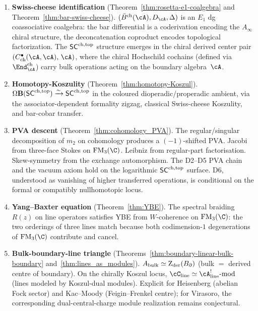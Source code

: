 \begin{enumerate}[label=\textbf{(\Alph*$'$)},leftmargin=2.5em]
\item \textbf{Swiss-cheese identification}
 (Theorem~\ref{thm:rosetta-e1-coalgebra} and
 Theorem~\ref{thm:bar-swiss-cheese}).
 $(\barBch(\cA), D_\cA, \Delta)$ is an $E_1$ dg coassociative
 coalgebra: the bar differential is a coderivation encoding
 the $A_\infty$ chiral structure, the deconcatenation coproduct
 encodes topological factorization. The $\mathsf{SC}^{\mathrm{ch,top}}$ structure
 emerges in the chiral derived center pair
 $(C^\bullet_{\mathrm{ch}}(\cA,\cA),\, \cA)$, where the
 chiral Hochschild cochains (defined via $\End^{\mathrm{ch}}_\cA$)
 carry bulk operations acting on the boundary algebra~$\cA$.

\item \textbf{Homotopy-Koszulity}
 (Theorem~\ref{thm:homotopy-Koszul}).
 $\Omega\mathbf{B}(\mathsf{SC}^{\mathrm{ch,top}}) \xrightarrow{\sim} \mathsf{SC}^{\mathrm{ch,top}}$
 in the coloured dioperadic/properadic ambient, via the
 associator-dependent formality zigzag, classical Swiss-cheese
 Koszulity, and bar-cobar transfer.

\item \textbf{PVA descent} (Theorem~\ref{thm:cohomology_PVA}).
 The regular/singular decomposition of $m_2$ on cohomology
 produces a $(-1)$-shifted PVA\@. Jacobi from three-face Stokes
 on $\FM_3(\C)$. Leibniz from regular-part factorisation.
 Skew-symmetry from the exchange automorphism. The D2--D5 PVA chain
 and the vacuum axiom hold on the logarithmic $\mathsf{SC}^{\mathrm{ch,top}}$ surface.
 D6, understood as vanishing of higher transferred operations, is
 conditional on the formal or compatibly nullhomotopic locus.

\item \textbf{Yang--Baxter equation} (Theorem~\ref{thm:YBE}).
 The spectral braiding $R(z)$ on line operators satisfies YBE
 from $W$-coherence on $\FM_3(\C)$: the two orderings of three
 lines match because both codimension-$1$ degenerations of
 $\FM_3(\C)$ contribute and cancel.

\item \textbf{Bulk-boundary-line triangle}
 (Theorems~\ref{thm:boundary-linear-bulk-boundary}
 and~\ref{thm:lines_as_modules}).
 $A_{\mathrm{bulk}} \simeq \operatorname{Z}_{\mathrm{der}}(B_{\partial})$ (bulk $=$ derived centre of
 boundary). On the chirally Koszul locus,
 $\cC_{\mathrm{line}} \simeq
 \cA^!_{\mathrm{line}}\text{-mod}$
 (lines modeled by Koszul-dual modules). Explicit for Heisenberg
 (abelian Fock sector) and Kac--Moody (Feigin--Frenkel centre);
 for Virasoro, the corresponding dual-central-charge module
 realization remains conjectural.


\end{enumerate}
